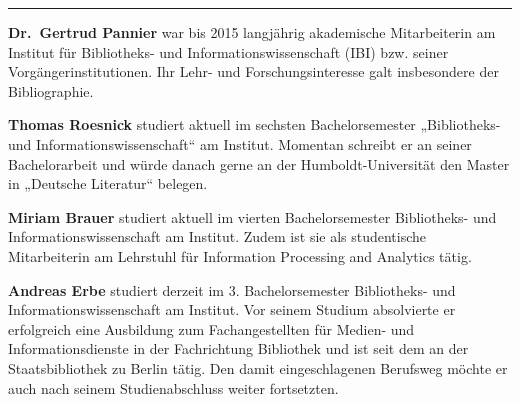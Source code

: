\begin{center}\rule{0.5\linewidth}{\linethickness}\end{center}

\textbf{Dr.~Gertrud Pannier} war bis 2015 langjährig akademische
Mitarbeiterin am Institut für Bibliotheks- und Informationswissenschaft
(IBI) bzw. seiner Vorgängerinstitutionen. Ihr Lehr- und
Forschungsinteresse galt insbesondere der Bibliographie.

\textbf{Thomas Roesnick} studiert aktuell im sechsten Bachelorsemester
„Bibliotheks- und Informationswissenschaft`` am Institut. Momentan
schreibt er an seiner Bachelorarbeit und würde danach gerne an der
Humboldt-Universität den Master in „Deutsche Literatur`` belegen.

\textbf{Miriam Brauer} studiert aktuell im vierten Bachelorsemester
Bibliotheks- und Informationswissenschaft am Institut. Zudem ist sie als
studentische Mitarbeiterin am Lehrstuhl für Information Processing and
Analytics tätig.

\textbf{Andreas Erbe} studiert derzeit im 3. Bachelorsemester
Bibliotheks- und Informationswissenschaft am Institut. Vor seinem
Studium absolvierte er erfolgreich eine Ausbildung zum Fachangestellten
für Medien- und Informationsdienste in der Fachrichtung Bibliothek und
ist seit dem an der Staatsbibliothek zu Berlin tätig. Den damit
eingeschlagenen Berufsweg möchte er auch nach seinem Studienabschluss
weiter fortsetzten.
